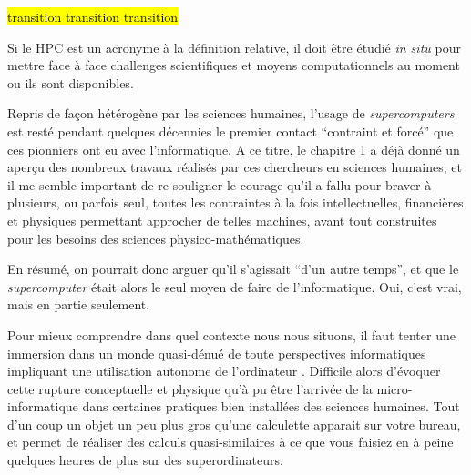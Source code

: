 


\hl{transition transition transition}

Si le HPC est un acronyme à la définition relative, il doit être étudié \textit{in situ} pour mettre face à face challenges scientifiques et moyens computationnels  au moment ou ils sont disponibles.



Repris de façon hétérogène par les sciences humaines, l’usage de \textit{supercomputers} est resté pendant quelques décennies le premier contact \enquote{contraint et forcé} que ces pionniers ont eu avec l'informatique. A ce titre, le chapitre 1 a déjà donné un aperçu des nombreux travaux réalisés par ces chercheurs en sciences humaines, et il me semble important de re-souligner le courage qu'il a fallu pour braver à plusieurs, ou parfois seul, toutes les contraintes à la fois intellectuelles, financières et physiques permettant approcher de telles machines, avant tout construites pour les besoins des sciences physico-mathématiques.

En résumé, on pourrait donc arguer qu'il s'agissait \enquote{d'un autre temps}, et que le \textit{supercomputer} était alors le seul moyen de faire de l'informatique. Oui, c'est vrai, mais en partie seulement.

Pour mieux comprendre dans quel contexte nous nous situons, il faut tenter une immersion dans un monde quasi-dénué de toute perspectives informatiques impliquant une utilisation autonome de l'ordinateur . Difficile alors d'évoquer cette rupture conceptuelle et physique qu'à pu être l'arrivée de la micro-informatique dans certaines pratiques bien installées des sciences humaines. Tout d'un coup un objet un peu plus gros qu'une calculette apparait sur votre bureau, et permet de réaliser des calculs quasi-similaires à ce que vous faisiez en à peine quelques heures de plus sur des superordinateurs.

